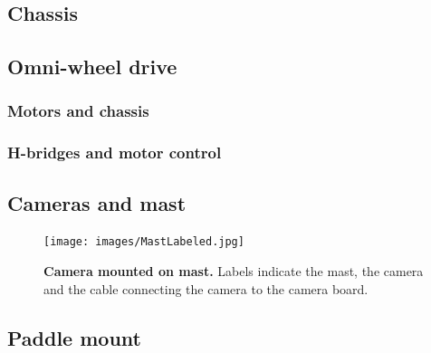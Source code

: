 \documentclass[letterpaper, 11pt]{article}
\begin{document}
\begin{enumerate}[label=\textbf{\arabic*.}]
\subsection{Chassis}

\subsection{Omni-wheel drive}
\subsubsection{Motors and chassis}
\subsubsection{H-bridges and motor control}

\subsection{Cameras and mast}

\begin{figure}[ht]
    \centering
    \texttt{[image: images/MastLabeled.jpg]}
    \caption{\textbf{Camera mounted on mast.} Labels indicate the mast, the camera and the cable connecting the camera to the camera board.}
    \label{fig:mast}
\end{figure}


\subsection{Paddle mount}


\end{enumerate}
\end{document}
